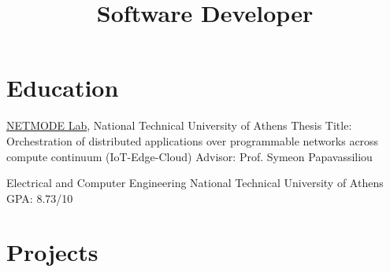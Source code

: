 \documentclass[11pt,a4paper,sans]{moderncv} %
\title{Software Developer}
\begin{document}

\makecvtitle %


\section{Education}

{\newline \href{https://www.netmode.ntua.gr/}{NETMODE Lab}, National Technical University of Athens}
{\newline Thesis Title: Orchestration of distributed applications over programmable networks across compute continuum (IoT-Edge-Cloud)}
{\newline Advisor: Prof. Symeon Papavassiliou}{}  %

{\newline Electrical and Computer Engineering}
{National Technical University of Athens}
{\newline GPA: 8.73/10}{}  %






\section{Projects}
\end{document}
